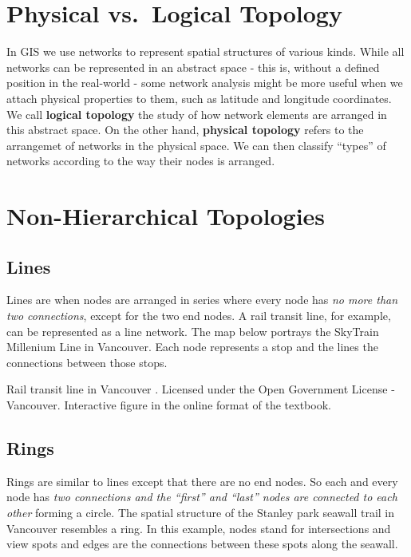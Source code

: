 \documentclass[
]{book}
\begin{document}
\hypertarget{physical-vs.-logical-topology}{%
\section{Physical vs.~Logical Topology}\label{physical-vs.-logical-topology}}

In GIS we use networks to represent spatial structures of various kinds. While all networks can be represented in an abstract space - this is, without a defined position in the real-world - some network analysis might be more useful when we attach physical properties to them, such as latitude and longitude coordinates. We call \textbf{logical topology} the study of how network elements are arranged in this abstract space. On the other hand, \textbf{physical topology} refers to the arrangemet of networks in the physical space. We can then classify ``types'' of networks according to the way their nodes is arranged.

\hypertarget{non-hierarchical-topologies}{%
\section{Non-Hierarchical Topologies}\label{non-hierarchical-topologies}}

\hypertarget{lines}{%
\subsection{Lines}\label{lines}}

Lines are when nodes are arranged in series where every node has \emph{no more than two connections}, except for the two end nodes. A rail transit line, for example, can be represented as a line network. The map below portrays the SkyTrain Millenium Line in Vancouver. Each node represents a stop and the lines the connections between those stops.

\label{fig:8-vancouver-rail-transit}Rail transit line in Vancouver \citep{city_of_vancouver_open_nodate}. Licensed under the Open Government License - Vancouver. Interactive figure in the online format of the textbook.

\hypertarget{rings}{%
\subsection{Rings}\label{rings}}

Rings are similar to lines except that there are no end nodes. So each and every node has \emph{two connections and the ``first'' and ``last'' nodes are connected to each other} forming a circle. The spatial structure of the Stanley park seawall trail in Vancouver resembles a ring. In this example, nodes stand for intersections and view spots and edges are the connections between these spots along the seawall.
\end{document}
